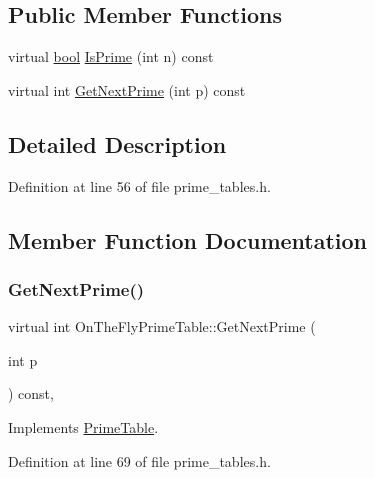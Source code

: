 \subsection*{Public Member Functions}
\begin{DoxyCompactItemize}
\item 
virtual \hyperlink{classbool}{bool} \hyperlink{classOnTheFlyPrimeTable_a1d49b78f79e018441289e79d75680067}{Is\+Prime} (int n) const
\item 
virtual int \hyperlink{classOnTheFlyPrimeTable_a5a4644fedd95d33136723f33b9302bfc}{Get\+Next\+Prime} (int p) const
\end{DoxyCompactItemize}


\subsection{Detailed Description}


Definition at line 56 of file prime\+\_\+tables.\+h.



\subsection{Member Function Documentation}
\mbox{\label{classOnTheFlyPrimeTable_a5a4644fedd95d33136723f33b9302bfc}} 
\subsubsection{\texorpdfstring{Get\+Next\+Prime()}{GetNextPrime()}}
{\footnotesize\ttfamily virtual int On\+The\+Fly\+Prime\+Table\+::\+Get\+Next\+Prime (\begin{DoxyParamCaption}\item[{int}]{p }\end{DoxyParamCaption}) const\hspace{0.3cm}{\ttfamily [inline]}, {\ttfamily [virtual]}}



Implements \hyperlink{classPrimeTable_ae537c939f56617d8937d57bbbae3ab30}{Prime\+Table}.



Definition at line 69 of file prime\+\_\+tables.\+h.



